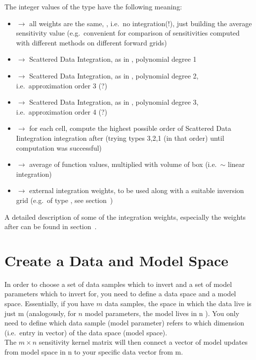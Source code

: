 The integer values of the type have the following meaning:
\begin{itemize}
  \item[]  $\rightarrow$ all weights are the same, , 
    i.e.\ no integration(!), just building the average sensitivity value (e.g.\ convenient for comparison of 
    sensitivities computed with different methods on different forward grids)
  \item[]  $\rightarrow$ Scattered Data Integration, as in \cite{Levin99}, polynomial degree 1
  \item[]  $\rightarrow$ Scattered Data Integration, as in \cite{Levin99}, polynomial degree 2, 
    i.e.\ approximation order 3 (?)
  \item[]  $\rightarrow$ Scattered Data Integration, as in \cite{Levin99}, polynomial degree 3, 
    i.e.\ approximation order 4 (?)
  \item[]  $\rightarrow$ for each cell, compute the highest possible order of Scattered Data Iintegration
    integration after \cite{Levin99} (trying types 3,2,1 (in that order) until computation was successful)
  \item[]  $\rightarrow$ average of function values, multiplied with volume of box (i.e.\ $\sim$ linear integration)
  \item[]  $\rightarrow$ external integration weights, to be used along with a suitable inversion grid 
    (e.g.\ of type , see section~)
\end{itemize}

A detailed description of some of the integration weights, especially the weights after \cite{Levin99} can be found in 
section~.
%
\section{Create a Data and Model Space} \label{basic_steps,sec:dmspace}
%
In order to choose a set of data samples which to invert and a set of model parameters which to invert for, 
you need to define a data space and a model space. Essentially, if you have $m$ data samples, the space in which 
the data live is just \R m (analogously, for $n$ model parameters, the model lives in \R n ). You only need to define which
data sample (model parameter) refers to which dimension (i.e.\ entry in vector) of the data space (model space).\\
The $m\times n$ sensitivity kernel matrix will then connect a vector of model updates from model space in \R n 
to your specific data vector from \R m.

